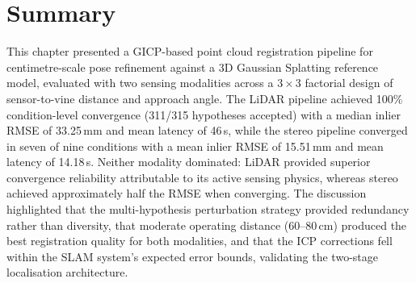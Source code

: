 \section{Summary}
\label{sec:precise-alignment-summary}

This chapter presented a GICP-based point cloud registration pipeline for centimetre-scale pose refinement against a 3D Gaussian Splatting reference model, evaluated with two sensing modalities across a $3 \times 3$ factorial design of sensor-to-vine distance and approach angle. The LiDAR pipeline achieved 100\% condition-level convergence (311/315 hypotheses accepted) with a median inlier RMSE of 33.25\,mm and mean latency of 46\,s, while the stereo pipeline converged in seven of nine conditions with a mean inlier RMSE of 15.51\,mm and mean latency of 14.18\,s. Neither modality dominated: LiDAR provided superior convergence reliability attributable to its active sensing physics, whereas stereo achieved approximately half the RMSE when converging. The discussion highlighted that the multi-hypothesis perturbation strategy provided redundancy rather than diversity, that moderate operating distance (60--80\,cm) produced the best registration quality for both modalities, and that the ICP corrections fell within the SLAM system's expected error bounds, validating the two-stage localisation architecture.